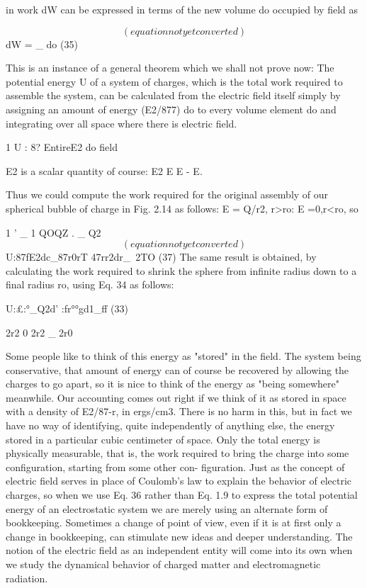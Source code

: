 in work dW can be expressed in terms of the new volume do occupied
by field as

\begin{equation}
(equation not yet converted)
\end{equation}
dW = _ do (35)

This is an instance of a general theorem which we shall not prove
now: The potential energy U of a system of charges, which is the total
work required to assemble the system, can be calculated from the electric
field itself simply by assigning an amount of energy (E2/877) do to
every volume element do and integrating over all space where there
is electric field.

1
U : 8? EntireE2 do 
field

E2 is a scalar quantity of course: E2 E E - E.

Thus we could compute the work required for the original assembly
of our spherical bubble of charge in Fig. 2.14 as follows: E = Q/r2,
r>ro: E =0,r<ro, so

1 ' _ 1 QOQZ . _ Q2
\begin{equation}
(equation not yet converted)
\end{equation}
U:87fE2dc_87r0rT 47rr2dr_~2TO (37)
The same result is obtained, by calculating the work required to
shrink the sphere from infinite radius down to a final radius ro, using
Eq. 34 as follows:

U:£:°_Q2d' :fr°°gd1_ff (33)

2r2 0 2r2 _ 2r0

 

Some people like to think of this energy as "stored" in the field.
The system being conservative, that amount of energy can of course
be recovered by allowing the charges to go apart, so it is nice to think
of the energy as "being somewhere" meanwhile. Our accounting
comes out right if we think of it as stored in space with a density of
E2/87-r, in ergs/cm3. There is no harm in this, but in fact we have no
way of identifying, quite independently of anything else, the energy
stored in a particular cubic centimeter of space. Only the total
energy is physically measurable, that is, the work required to bring
the charge into some configuration, starting from some other con-
figuration. Just as the concept of electric field serves in place of
Coulomb's law to explain the behavior of electric charges, so when
we use Eq. 36 rather than Eq. 1.9 to express the total potential energy
of an electrostatic system we are merely using an alternate form of
bookkeeping. Sometimes a change of point of view, even if it is at
first only a change in bookkeeping, can stimulate new ideas and
deeper understanding. The notion of the electric field as an independent
entity will come into its own when we study the dynamical
behavior of charged matter and electromagnetic radiation.

